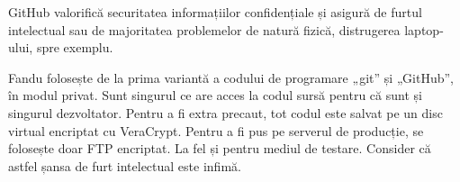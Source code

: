 	GitHub valorifică securitatea informațiilor confidențiale și asigură de furtul intelectual sau de majoritatea problemelor de natură fizică, distrugerea laptop-ului, spre exemplu.

	Fandu folosește de la prima variantă a codului de programare „git” și „GitHub”, în modul privat.
	Sunt singurul ce are acces la codul sursă pentru că sunt și singurul dezvoltator.
	Pentru a fi extra precaut, tot codul este salvat pe un disc virtual encriptat cu VeraCrypt.
	Pentru a fi pus pe serverul de producție, se folosește doar FTP encriptat.
	La fel și pentru mediul de testare.
	Consider că astfel șansa de furt intelectual este infimă.

